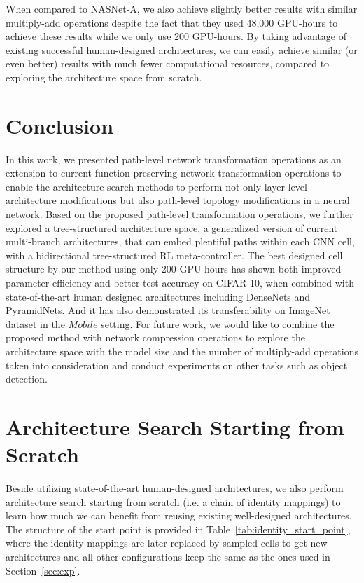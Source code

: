 \documentclass{article}
\begin{document}
When compared to NASNet-A, we also achieve slightly better results with similar multiply-add operations despite the fact that they used 48,000 GPU-hours to achieve these results while we only use 200 GPU-hours. By taking advantage of existing successful human-designed architectures, we can easily achieve similar (or even better) results with much fewer computational resources, compared to exploring the architecture space from scratch. 

\section{Conclusion}
In this work, we presented path-level network transformation operations as an extension to current function-preserving network transformation operations to enable the architecture search methods to perform not only layer-level architecture modifications but also path-level topology modifications in a neural network. Based on the proposed path-level transformation operations, we further explored a tree-structured architecture space, a generalized version of current multi-branch architectures, that can embed plentiful paths within each CNN cell, with a bidirectional tree-structured RL meta-controller. The best designed cell structure by our method using only 200 GPU-hours has shown both improved parameter efficiency and better test accuracy on CIFAR-10, when combined with state-of-the-art human designed architectures including DenseNets and PyramidNets. And it has also demonstrated its transferability on ImageNet dataset in the $Mobile$ setting. For future work, we would like to combine the proposed method with network compression operations to explore the architecture space with the model size and the number of multiply-add operations taken into consideration and conduct experiments on other tasks such as object detection.




\clearpage
\appendix


\section{Architecture Search Starting from Scratch}
Beside utilizing state-of-the-art human-designed architectures, we also perform architecture search starting from scratch (i.e. a chain of identity mappings) to learn how much we can benefit from reusing existing well-designed architectures. The structure of the start point is provided in Table~\ref{tab:identity_start_point}, where the identity mappings are later replaced by sampled cells to get new architectures and all other configurations keep the same as the ones used in Section~\ref{sec:exp}. 
\end{document}

